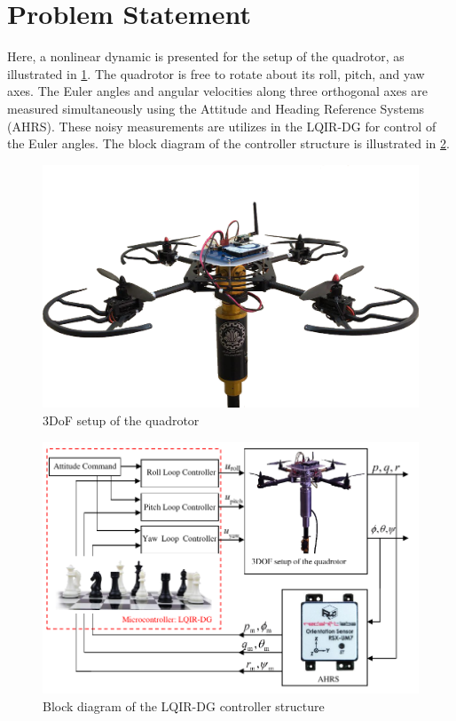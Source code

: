\documentclass[conference]{IEEEtran}
\begin{document}
\section{Problem Statement}\label{sec:problem_statement}
\noindent Here, a nonlinear dynamic is presented for the setup of the quadrotor, as illustrated in \figurename{\ref{quadlab}}.
The quadrotor is free to rotate about its roll, pitch, and yaw axes. The Euler angles and angular velocities along three orthogonal axes are measured simultaneously using the Attitude and Heading Reference Systems (AHRS). These noisy measurements are utilizes in the LQIR-DG for control of the Euler angles.
The block diagram of the controller structure is illustrated in \figurename{\ref{block_diagram}}.
\vspace{-1cm}
\begin{figure}[!h]
	\vspace{0.1cm}
	\includegraphics[width=\linewidth]{../Figures/introduction/3DOFQuad.png}
	\centering
	\caption{3DoF setup of the quadrotor %
	}
	\label{quadlab}
\end{figure}
\begin{figure}[!h]
	\includegraphics[width=\linewidth]{../Figures/introduction/schematic.pdf}
	\centering
	\caption{Block diagram of the LQIR-DG controller structure}
	\label{block_diagram}
\end{figure}
\end{document}
